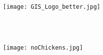 {\color{HeaderOrangeE}\HRule}  \\[.3cm] %
\\[.4cm] %
\begin{figure}[H] %
\begin{center}	%
\texttt{[image: GIS\_Logo\_better.jpg]}
\end{center}
\end{figure}
\Huge \bfseries \titlename \\ %
{\color{HeaderOrangeE}\HRule}  \\[.4cm] %
\begin{figure}[H] %
\begin{center}	%
\texttt{[image: noChickens.jpg]}
\end{center}
\end{figure}
\author{\Large Allegan County GIS \\ \Large www.allegancounty.org/gis} %
